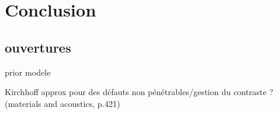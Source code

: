 \chapter{Conclusion}

\section{ouvertures}
prior modele

Kirchhoff approx pour des défauts non pénétrables/gestion du contraste ? (materials and acoustics, p.421)